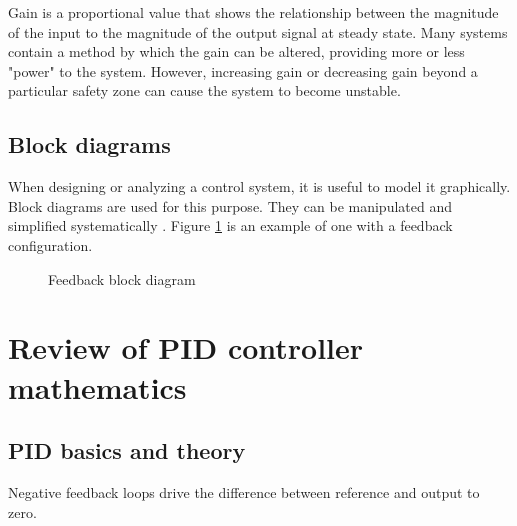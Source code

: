 \documentclass[10pt,conference,compsoc]{IEEEtran}
\begin{document}
Gain is a proportional value that shows the relationship between the magnitude
of the input to the magnitude of the output signal at steady state. Many
\glspl{system} contain a method by which the gain can be altered, providing more
or less "power" to the \gls{system}. However, increasing gain or decreasing gain
beyond a particular safety zone can cause the \gls{system} to become unstable.

\subsection{Block diagrams}

When designing or analyzing a control system, it is useful to model it
graphically. Block diagrams are used for this purpose. They can be manipulated
and simplified systematically \cite{bib:block_diagrams}. Figure
\ref{fig:feedback_loop} is an example of one with a feedback configuration.

\begin{figure}[H]
  \centering


  \caption{Feedback block diagram}
  \label{fig:feedback_loop}
\end{figure}

\section{Review of PID controller mathematics}

\subsection{PID basics and theory}

Negative feedback loops drive the difference between \gls{reference} and
\gls{output} to zero. \\
\end{document}

